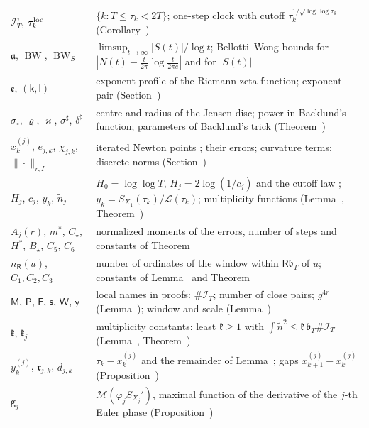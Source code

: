 \documentclass[preprint,12pt]{elsarticle}
\makeatletter
\let\CG@origref\ref
\let\CG@origeqref\eqref
\newcommand{\CG@gettip}[1]{\@ifundefined{CGTip@#1}{Reference: #1}{\csname CGTip@#1\endcsname}}
\DeclareRobustCommand{\CGref}[1]{\pdftooltip{\CG@origref{#1}}{\CG@gettip{#1}}}
\DeclareRobustCommand{\CGeqref}[1]{\pdftooltip{\CG@origeqref{#1}}{\CG@gettip{#1}}}
\numberwithin{equation}{section}
\theoremstyle{plain}
\theoremstyle{definition}
\theoremstyle{remark}
\newcommand{\lL}{\mathcal L}
\newcommand{\IT}{\mathcal I_T}
\newcommand{\BW}{\operatorname{BW}}
\newcommand{\BWS}{\operatorname{BW}_S}
\makeatother
\begin{document}
\begin{center}
\begin{longtable}{p{}p{}}
$\mathcal I_T^\tau$, $\tau_k^{\rm loc}$ & $\{k:T\le\tau_k<2T\}$; one-step clock with cutoff $\tau_k^{1/\sqrt{\log\log\tau_k}}$ (Corollary~\CGref{cor:local_clock})\\
$\mathfrak a$, $\BW$, $\BWS$ & $\limsup_{t\to\infty}|S(t)|/\log t$; Bellotti--Wong bounds for $|N(t)-\frac t{2\pi}\log\frac t{2\pi e}|$ and for $|S(t)|$ \CGeqref{eq:BWS_def}\\
$\mathfrak e$, $(\mathsf k,\mathsf l)$ & exponent profile of the Riemann zeta function; exponent pair (Section~\CGref{sec:envelope})\\
$\sigma_\circ$, $\varrho$, $\varkappa$, $\sigma^\sharp$, $\delta^\sharp$ & centre and radius of the Jensen disc; power in Backlund's function; parameters of Backlund's trick (Theorem~\CGref{thm:known_backlund})\\
$x^{(j)}_k$, $e_{j,k}$, $\chi_{j,k}$, $\|\cdot\|_{r,I}$ & iterated Newton points \CGeqref{eq:newton_iteration}; their errors; curvature terms; discrete norms (Section~\CGref{sec:iteration})\\
$H_j$, $c_j$, $y_k$, $\tilde n_j$ & $H_0=\log\log T$, $H_j=2\log(1/c_j)$ and the cutoff law \CGeqref{eq:cutoff_law}; $y_k=S_{X_1}(\tau_k)/\lL(\tau_k)$; multiplicity functions (Lemma~\CGref{lem:multiplicity}, Theorem~\CGref{thm:multiplicity_all})\\
$A_j(r)$, $m^*$, $C_\star$, $H^*$, $B_\star$, $C_5$, $C_6$ & normalized moments of the errors, number of steps and constants of Theorem~\CGref{thm:uniform_iteration}\\
$n_{\mathsf R}(u)$, $C_1,C_2,C_3$ & number of ordinates of the window within $\mathsf R\mathfrak b_T$ of $u$; constants of Lemma~\CGref{lem:zero_pairs} and Theorem~\CGref{thm:multiplicity_all}\\
$\mathsf M$, $\mathsf P$, $\mathsf F$, $\mathsf s$, $\mathsf W$, $\mathsf y$ & local names in proofs: $\#\IT$; number of close pairs; $g^{4r}$ (Lemma~\CGref{lem:sampling_rho}); window and scale (Lemma~\CGref{lem:maximal_primes})\\
$\mathfrak k$, $\mathfrak k_j$ & multiplicity constants: least $\mathfrak k\ge1$ with $\int\tilde n^2\le\mathfrak k\,\mathfrak b_T\#\IT$ (Lemma~\CGref{lem:sampling_rho}, Theorem~\CGref{thm:uniform_iteration})\\
$y^{(j)}_k$, $\mathfrak r_{j,k}$, $d_{j,k}$ & $\tau_k-x^{(j)}_k$ and the remainder of Lemma~\CGref{lem:second_identity}; gaps $x^{(j)}_{k+1}-x^{(j)}_k$ (Proposition~\CGref{prop:deformation})\\
$\mathsf g_j$ & $\mathcal M(\varphi_jS_{X_j}')$, maximal function of the derivative of the $j$-th Euler phase (Proposition~\CGref{prop:recursion})\\

\end{longtable}
\end{center}
\end{document}
